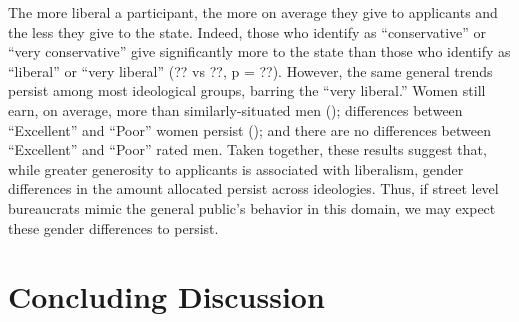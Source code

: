 \documentclass[12pt]{article}%
\begin{document}
\begin{doublespace}
The more liberal a participant, the more on average they give to applicants and the less they give to the state. Indeed, those who identify as “conservative” or “very conservative” give significantly more to the state than those who identify as “liberal” or “very liberal” (?? vs ??, p = ??). However, the same general trends persist among most ideological groups, barring the “very liberal.” Women still earn, on average, more than similarly-situated men (); differences between “Excellent” and “Poor” women persist (); and there are no differences between “Excellent” and “Poor” rated men. Taken together, these results suggest that, while greater generosity to applicants is associated with liberalism, gender differences in the amount allocated persist across ideologies. Thus, if street level bureaucrats mimic the general public’s behavior in this domain, we may expect these gender differences to persist.

\section*{Concluding Discussion} 

\end{doublespace}


%
\end{document}
